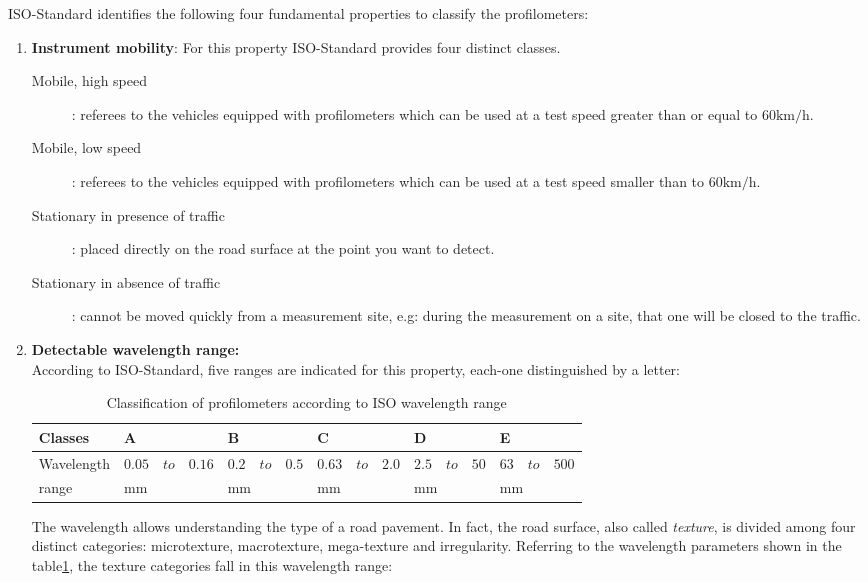 \documentclass[tesi]{subfiles}
\begin{document}
ISO-Standard\cite{iso_standard} identifies the following four fundamental properties to classify the profilometers:
\begin{enumerate}

\item \textbf{Instrument mobility}: For this property ISO-Standard\cite{iso_standard} provides four distinct classes.
\begin{description}
\item [Mobile, high speed]: referees to the vehicles equipped with profilometers which can be used at a test speed greater than or equal to $\num{60} \si{\km\per\hour}$.
\item [Mobile, low speed]: referees to the vehicles equipped with profilometers which can be used at a test speed smaller than to $\num{60} \si{\km\per\hour}$.
\item [Stationary in presence of traffic]: placed directly on the road surface at the point you want to detect.
\item [Stationary in absence of traffic]: cannot be moved quickly from a measurement site, e.g: during the measurement on a site, that one will be closed to the traffic.
\end{description}
\item \textbf{Detectable wavelength range:}\\ According to ISO-Standard\cite{iso_standard}, five ranges are indicated for this property, each-one distinguished by a letter:


\begin{table}[ht]
\centering
    \begin{tabular}{ | l | l | l | l | l | l |}

    \hline
    Classes &\quad A &\quad B &\quad C &\quad D &\quad E \\ \hline
    Wavelength &	$ 0.05 \quad to \quad 0.16$&	$ 0.2 \quad to \quad 0.5$&		$0.63 \quad to \quad 2.0$&	$2.5 \quad to \quad 50$&	$63 \quad to \quad 500$\\
    \quad range &\quad $\si{\milli\meter}$ &\quad  $\si{\milli\meter}$ &\quad  $\si{\milli\meter}$ &\quad  $\si{\milli\meter}$ &\quad  $\si{\milli\meter}$ \\
\hline
    \end{tabular}
 \caption{Classification of profilometers according to ISO wavelength range}
 \label{table:iso_wave}
\end{table}

The wavelength allows understanding the type of a road pavement. In fact, the road surface, also called \textit{texture}, is divided among four distinct categories: microtexture, macrotexture, mega-texture and irregularity. Referring to the wavelength parameters shown in the table\ref{table:iso_wave}, the texture categories fall in this wavelength range\cite{sayers1996interpretation}:


\end{enumerate}
\end{document}
